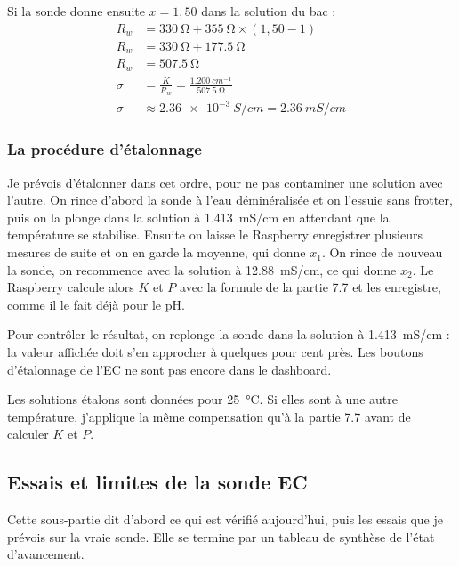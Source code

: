 \begin{exemple}
Si la sonde donne ensuite $x = 1{,}50$ dans la solution du bac :
\begin{align*}
R_w &= \qty{330}{\ohm} + \qty{355}{\ohm}\times(1{,}50 - 1)\\
R_w &= \qty{330}{\ohm} + \qty{177,5}{\ohm}\\
R_w &= \qty{507,5}{\ohm}\\
\sigma &= \frac{K}{R_w} = \frac{\qty{1,200}{cm^{-1}}}{\qty{507,5}{\ohm}}\\
\sigma &\approx \qty{2,36e-3}{S/cm} = \qty{2,36}{mS/cm}
\end{align*}
\end{exemple}

\subsubsection*{La procédure d'étalonnage}

Je prévois d'étalonner dans cet ordre, pour ne pas contaminer une solution avec l'autre. On rince d'abord la sonde à l'eau déminéralisée et on l'essuie sans frotter, puis on la plonge dans la solution à \qty{1,413}{mS/cm} en attendant que la température se stabilise. Ensuite on laisse le Raspberry enregistrer plusieurs mesures de suite et on en garde la moyenne, qui donne $x_1$. On rince de nouveau la sonde, on recommence avec la solution à \qty{12,88}{mS/cm}, ce qui donne $x_2$. Le Raspberry calcule alors $K$ et $P$ avec la formule de la partie 7.7 et les enregistre, comme il le fait déjà pour le pH.

Pour contrôler le résultat, on replonge la sonde dans la solution à \qty{1,413}{mS/cm} : la valeur affichée doit s'en approcher à quelques pour cent près. Les boutons d'étalonnage de l'EC ne sont pas encore dans le dashboard.

\begin{attention}
Les solutions étalons sont données pour \qty{25}{\celsius}. Si elles sont à une autre température, j'applique la même compensation qu'à la partie 7.7 avant de calculer $K$ et $P$.
\end{attention}

\subsection{Essais et limites de la sonde EC}

Cette sous-partie dit d'abord ce qui est vérifié aujourd'hui, puis les essais que je prévois sur la vraie sonde. Elle se termine par un tableau de synthèse de l'état d'avancement.

